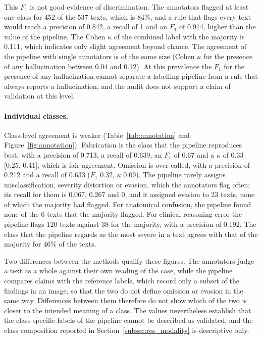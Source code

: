 \documentclass[11pt,a4paper]{article}
\begin{document}
This $F_1$ is not good evidence of discrimination. The annotators flagged at least one class for 452 of the 537 texts, which is 84\%, and a rule that flags every text would reach a precision of 0.842, a recall of 1 and an $F_1$ of 0.914, higher than the value of the pipeline. The Cohen $\kappa$ of the combined label with the majority is 0.111, which indicates only slight agreement beyond chance. The agreement of the pipeline with single annotators is of the same size (Cohen $\kappa$ for the presence of any hallucination between 0.04 and 0.12). At this prevalence the $F_1$ for the presence of any hallucination cannot separate a labelling pipeline from a rule that always reports a hallucination, and the audit does not support a claim of validation at this level.

\paragraph{Individual classes.} Class-level agreement is weaker (Table~\ref{tab:annotation} and Figure~\ref{fig:annotation}). Fabrication is the class that the pipeline reproduces best, with a precision of 0.713, a recall of 0.639, an $F_1$ of 0.67 and a $\kappa$ of 0.33 [0.25, 0.41], which is fair agreement. Omission is over-called, with a precision of 0.212 and a recall of 0.633 ($F_1$ 0.32, $\kappa$ 0.09). The pipeline rarely assigns misclassification, severity distortion or evasion, which the annotators flag often; its recall for them is 0.067, 0.267 and 0, and it assigned evasion to 23 texts, none of which the majority had flagged. For anatomical confusion, the pipeline found none of the 6 texts that the majority flagged. For clinical reasoning error the pipeline flags 120 texts against 38 for the majority, with a precision of 0.192. The class that the pipeline regards as the most severe in a text agrees with that of the majority for 46\% of the texts.

Two differences between the methods qualify these figures. The annotators judge a text as a whole against their own reading of the case, while the pipeline compares claims with the reference labels, which record only a subset of the findings in an image, so that the two do not define omission or evasion in the same way. Differences between them therefore do not show which of the two is closer to the intended meaning of a class. The values nevertheless establish that the class-specific labels of the pipeline cannot be described as validated, and the class composition reported in Section~\ref{subsec:res_modality} is descriptive only.
\end{document}
